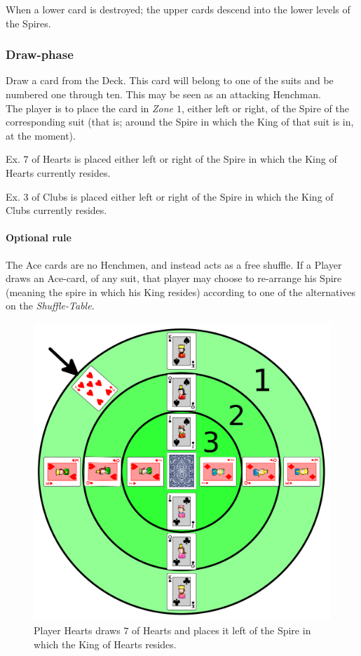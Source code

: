 \documentclass[11pt,twocolumn]{article}
\begin{document}
\noindent
When a lower card is destroyed; the upper cards descend into the lower levels of the Spires.

\subsubsection{Draw-phase}
\label{sec:playingshufflespires_drawphase}
Draw a card from the Deck.
This card will belong to one of the suits and be numbered one through ten.
This may be seen as an attacking Henchman.\\

\noindent
The player is to place the card in \textit{Zone $1$}, either left or right, of the Spire of the corresponding suit (that is; around the Spire in which the King of that suit is in, at the moment).

Ex. $7$ of Hearts is placed either left or right of the Spire in which the King of Hearts currently resides.

Ex. $3$ of Clubs is placed either left or right of the Spire in which the King of Clubs currently resides.

\paragraph{Optional rule}
The Ace cards are no Henchmen, and instead acts as a free shuffle.
If a Player draws an Ace-card, of any suit, that player may choose to re-arrange his Spire (meaning the spire in which his King resides) according to one of the alternatives on the \textit{Shuffle-Table}.

\begin{figure}[h!]
\centering
\includegraphics[width=\linewidth]{img/draw.png}
\caption{Player Hearts draws $7$ of Hearts and places it left of the Spire in which the King of Hearts resides.}
\label{fig:draw}
\end{figure}
\end{document}
